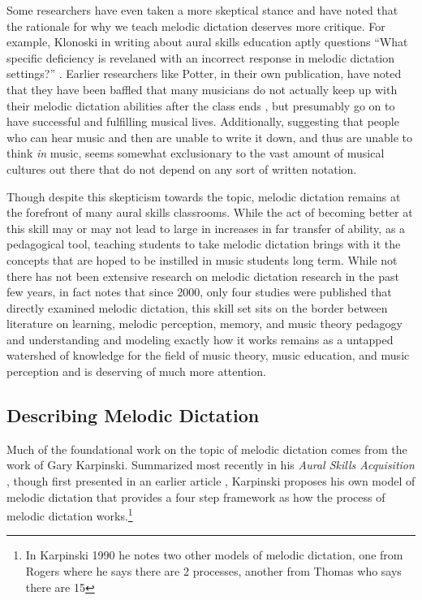 \documentclass[]{book}
\let\rmarkdownfootnote\footnote%
\def\footnote{\protect\rmarkdownfootnote}
\theoremstyle{definition}
\theoremstyle{definition}
\theoremstyle{definition}
\theoremstyle{remark}
\begin{document}
Some researchers have even taken a more skeptical stance and have noted
that the rationale for why we teach melodic dictation deserves more
critique. For example, Klonoski in writing about aural skills education
aptly questions ``What specific deficiency is revelaned with an
incorrect response in melodic dictation settings?''
\citep{klonoskiImprovingDictationAuralSkills2006}. Earlier researchers
like Potter, in their own publication, have noted that they have been
baffled that many musicians do not actually keep up with their melodic
dictation abilities after the class ends
\citep{potterIdentifyingSucessfulDictation1990}, but presumably go on to
have successful and fulfilling musical lives. Additionally, suggesting
that people who can hear music and then are unable to write it down, and
thus are unable to think \emph{in} music, seems somewhat exclusionary to
the vast amount of musical cultures out there that do not depend on any
sort of written notation.

Though despite this skepticism towards the topic, melodic dictation
remains at the forefront of many aural skills classrooms. While the act
of becoming better at this skill may or may not lead to large in
increases in far transfer of ability, as a pedagogical tool, teaching
students to take melodic dictation brings with it the concepts that are
hoped to be instilled in music students long term. While not there has
not been extensive research on melodic dictation research in the past
few years, in fact \citep{paneyEffectDirectingAttention2016} notes that
since 2000, only four studies were published that directly examined
melodic dictation, this skill set sits on the border between literature
on learning, melodic perception, memory, and music theory pedagogy and
understanding and modeling exactly how it works remains as a untapped
watershed of knowledge for the field of music theory, music education,
and music perception and is deserving of much more attention.

\hypertarget{describing-melodic-dictation}{%
\subsection{Describing Melodic
Dictation}\label{describing-melodic-dictation}}

Much of the foundational work on the topic of melodic dictation comes
from the work of Gary Karpinski. Summarized most recently in his
\emph{Aural Skills Acquisition}
\citep{karpinskiAuralSkillsAcquisition2000}, though first presented in
an earlier article \citep{karpinskiModelMusicPerception1990}, Karpinski
proposes his own model of melodic dictation that provides a four step
framework as how the process of melodic dictation works.\footnote{In
  Karpinski 1990 he notes two other models of melodic dictation, one
  from Rogers where he says there are 2 processes, another from Thomas
  who says there are 15}
\end{document}
